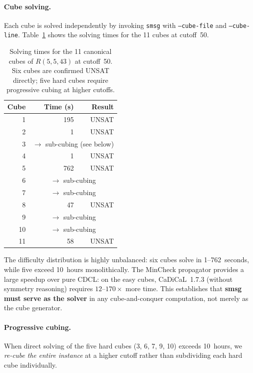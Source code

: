 \documentclass[11pt,a4paper]{article}
\theoremstyle{definition}
\theoremstyle{remark}
\begin{document}
\paragraph{Cube solving.}
Each cube is solved independently by invoking \texttt{smsg} with
\texttt{--cube-file} and \texttt{--cube-line}.
Table~\ref{tab:sms-cubes} shows the solving times for the 11 cubes
at cutoff~50.

\begin{table}[h]
\centering
\begin{tabular}{rrr}
\toprule
\textbf{Cube} & \textbf{Time (s)} & \textbf{Result} \\
\midrule
 1 &  195 & UNSAT \\
 2 &    1 & UNSAT \\
 3 & \multicolumn{2}{c}{$\to$ sub-cubing (see below)} \\
 4 &    1 & UNSAT \\
 5 &  762 & UNSAT \\
 6 & \multicolumn{2}{c}{$\to$ sub-cubing} \\
 7 & \multicolumn{2}{c}{$\to$ sub-cubing} \\
 8 &   47 & UNSAT \\
 9 & \multicolumn{2}{c}{$\to$ sub-cubing} \\
10 & \multicolumn{2}{c}{$\to$ sub-cubing} \\
11 &   58 & UNSAT \\
\bottomrule
\end{tabular}
\caption{Solving times for the 11 canonical cubes of
$R(5,5,43)$ at cutoff~50.  Six cubes are confirmed UNSAT
directly; five hard cubes require progressive cubing at higher cutoffs.}
\label{tab:sms-cubes}
\end{table}

The difficulty distribution is highly unbalanced: six cubes solve
in 1--762~seconds, while five exceed 10~hours monolithically.
The MinCheck propagator provides a large speedup
over pure CDCL: on the easy cubes, CaDiCaL~1.7.3 (without
symmetry reasoning) requires $12$--$170\times$ more time.
This establishes that \textbf{smsg must serve as the solver}
in any cube-and-conquer computation, not merely as the cube generator.

\paragraph{Progressive cubing.}
When direct solving of the five hard cubes (3, 6, 7, 9, 10)
exceeds 10~hours, we \emph{re-cube the entire instance} at a
higher cutoff rather than subdividing each hard cube individually.
\end{document}
